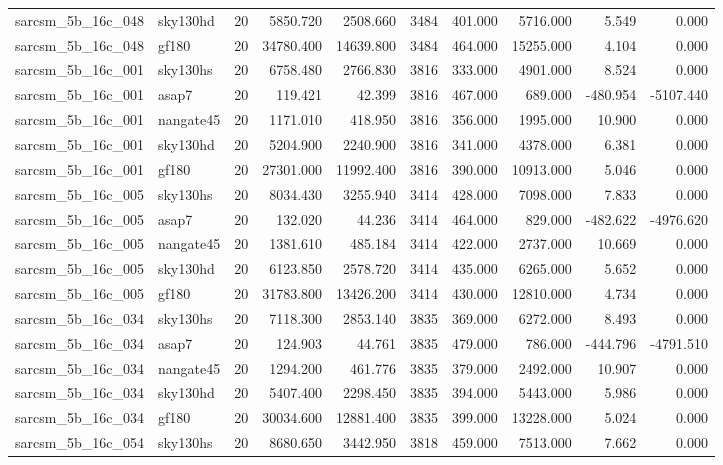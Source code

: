 \documentclass{article}
\begin{document}
\begin{longtable}{llrrrrrrrr}
sarcsm\_5b\_16c\_048 & sky130hd & 20 & 5850.720 & 2508.660 & 3484 & 401.000 & 5716.000 & 5.549 & 0.000 \\
sarcsm\_5b\_16c\_048 & gf180 & 20 & 34780.400 & 14639.800 & 3484 & 464.000 & 15255.000 & 4.104 & 0.000 \\
sarcsm\_5b\_16c\_001 & sky130hs & 20 & 6758.480 & 2766.830 & 3816 & 333.000 & 4901.000 & 8.524 & 0.000 \\
sarcsm\_5b\_16c\_001 & asap7 & 20 & 119.421 & 42.399 & 3816 & 467.000 & 689.000 & -480.954 & -5107.440 \\
sarcsm\_5b\_16c\_001 & nangate45 & 20 & 1171.010 & 418.950 & 3816 & 356.000 & 1995.000 & 10.900 & 0.000 \\
sarcsm\_5b\_16c\_001 & sky130hd & 20 & 5204.900 & 2240.900 & 3816 & 341.000 & 4378.000 & 6.381 & 0.000 \\
sarcsm\_5b\_16c\_001 & gf180 & 20 & 27301.000 & 11992.400 & 3816 & 390.000 & 10913.000 & 5.046 & 0.000 \\
sarcsm\_5b\_16c\_005 & sky130hs & 20 & 8034.430 & 3255.940 & 3414 & 428.000 & 7098.000 & 7.833 & 0.000 \\
sarcsm\_5b\_16c\_005 & asap7 & 20 & 132.020 & 44.236 & 3414 & 464.000 & 829.000 & -482.622 & -4976.620 \\
sarcsm\_5b\_16c\_005 & nangate45 & 20 & 1381.610 & 485.184 & 3414 & 422.000 & 2737.000 & 10.669 & 0.000 \\
sarcsm\_5b\_16c\_005 & sky130hd & 20 & 6123.850 & 2578.720 & 3414 & 435.000 & 6265.000 & 5.652 & 0.000 \\
sarcsm\_5b\_16c\_005 & gf180 & 20 & 31783.800 & 13426.200 & 3414 & 430.000 & 12810.000 & 4.734 & 0.000 \\
sarcsm\_5b\_16c\_034 & sky130hs & 20 & 7118.300 & 2853.140 & 3835 & 369.000 & 6272.000 & 8.493 & 0.000 \\
sarcsm\_5b\_16c\_034 & asap7 & 20 & 124.903 & 44.761 & 3835 & 479.000 & 786.000 & -444.796 & -4791.510 \\
sarcsm\_5b\_16c\_034 & nangate45 & 20 & 1294.200 & 461.776 & 3835 & 379.000 & 2492.000 & 10.907 & 0.000 \\
sarcsm\_5b\_16c\_034 & sky130hd & 20 & 5407.400 & 2298.450 & 3835 & 394.000 & 5443.000 & 5.986 & 0.000 \\
sarcsm\_5b\_16c\_034 & gf180 & 20 & 30034.600 & 12881.400 & 3835 & 399.000 & 13228.000 & 5.024 & 0.000 \\
sarcsm\_5b\_16c\_054 & sky130hs & 20 & 8680.650 & 3442.950 & 3818 & 459.000 & 7513.000 & 7.662 & 0.000 \\

\end{longtable}
\end{document}
